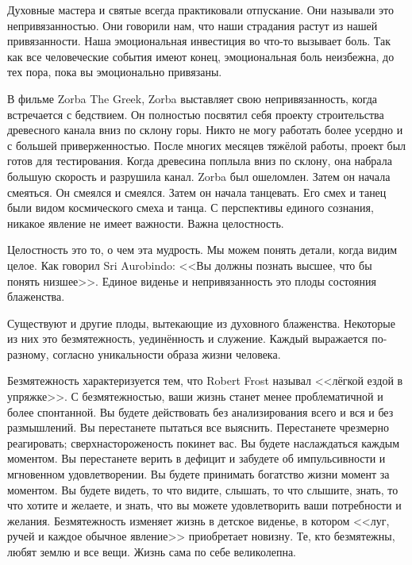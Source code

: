 \documentclass[10pt, fleqn]{article}
\begin{document}

Духовные мастера и святые всегда практиковали отпускание. Они называли это непривязанностью. Они говорили нам, что наши страдания растут из нашей привязанности. Наша эмоциональная инвестиция во что-то вызывает боль. Так как все человеческие события имеют конец, эмоциональная боль неизбежна, до тех пора, пока вы эмоционально привязаны.

В фильме Zorba The Greek, Zorba выставляет свою непривязанность, когда встречается с бедствием. Он полностью посвятил себя проекту строительства древесного канала вниз по склону горы. Никто не могу работать более усердно и с большей приверженностью. После многих месяцев тяжёлой работы, проект был готов для тестирования. Когда древесина поплыла вниз по склону, она набрала большую скорость и разрушила канал. Zorba был ошеломлен. Затем он начала смеяться. Он смеялся и смеялся. Затем он начала танцевать. Его смех и танец были видом космического смеха и танца. С перспективы единого сознания, никакое явление не имеет важности. Важна целостность.

Целостность это то, о чем эта мудрость. Мы можем понять детали, когда видим целое. Как говорил Sri Aurobindo: <<Вы должны познать высшее, что бы понять низшее>>. Единое виденье и непривязанность это плоды состояния блаженства.

Существуют и другие плоды, вытекающие из духовного блаженства. Некоторые из них это безмятежность, уединённость и служение. Каждый выражается по-разному, согласно уникальности образа жизни человека.


Безмятежность характеризуется тем, что Robert Frost называл <<лёгкой ездой в упряжке>>. С безмятежностью, ваши жизнь станет менее проблематичной и более спонтанной. Вы будете действовать без анализирования всего и вся и без размышлений. Вы перестанете пытаться все выяснить. Перестанете чрезмерно реагировать; сверхнастороженость покинет вас. Вы будете наслаждаться каждым моментом. Вы перестанете верить в дефицит и забудете об импульсивности и мгновенном удовлетворении. Вы будете принимать богатство жизни момент за моментом. Вы будете видеть, то что видите, слышать, то что слышите, знать, то что хотите и желаете, и знать, что вы можете удовлетворить ваши потребности и желания. Безмятежность изменяет жизнь в детское виденье, в котором <<луг, ручей и каждое обычное явление>> приобретает новизну. Те, кто безмятежны, любят землю и все вещи. Жизнь сама по себе великолепна.
\end{document}
